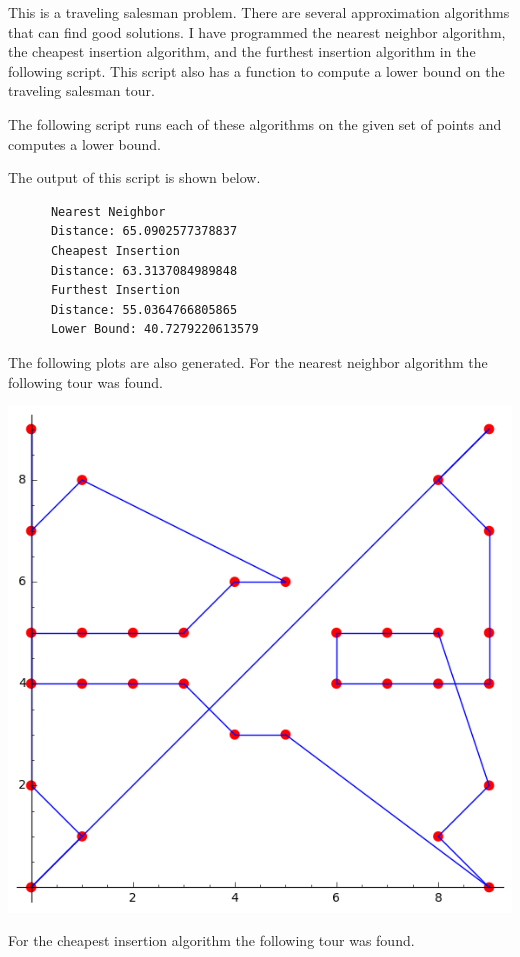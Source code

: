 \documentclass[11pt, oneside]{article}
\begin{document}
\begin{enumerate}
    This is a traveling salesman problem.
    There are several approximation algorithms that can find good solutions.
    I have programmed the nearest neighbor algorithm, the cheapest insertion
    algorithm, and the furthest insertion algorithm in the following script.
    This script also has a function to compute a lower bound on the traveling
    salesman tour.
    
    The following script runs each of these algorithms on the given set of
    points and computes a lower bound.
    
    The output of this script is shown below.
    \begin{verbatim}
      Nearest Neighbor
      Distance: 65.0902577378837
      Cheapest Insertion
      Distance: 63.3137084989848
      Furthest Insertion
      Distance: 55.0364766805865
      Lower Bound: 40.7279220613579
    \end{verbatim}
    The following plots are also generated.
    For the nearest neighbor algorithm the following tour was found.
    \begin{center}
      \includegraphics[scale=.5]{Figures/final_1.png}
    \end{center}
    For the cheapest insertion algorithm the following tour was found.
    \begin{center}

\end{center}
\end{enumerate}
\end{document}
